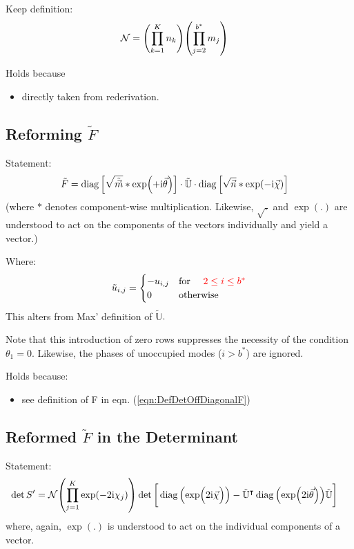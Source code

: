\documentclass[
	english,
	a4paper,
	fontsize=10pt,
	parskip=half,
	titlepage=true,
	DIV=12,
	final
]{scrreprt}
\newcommand*{\transp}{\ensuremath{^\intercal}}
\newcommand*{\iunit}{\ensuremath{\mathrm{i}}}
\DeclareMathOperator{\diag}{diag}
\begin{document}
Keep definition:
\begin{align}
	\mathcal{N}
&=
	\qty( \prod_{k=1}^{K}   n_k )
	\qty( \prod_{j=2}^{b^*} m_j )
\label{eqn:DefN}
\end{align}

Holds because
\begin{itemize}
\item directly taken from rederivation.
\end{itemize}

\subsection{Reforming $\tilde{F}$}
Statement:
\begin{align}
	\tilde{F}
&=
	\diag\qty[ \sqrt{ \tilde{\vec{m}}} * \exp(+\iunit \vec{\theta}) ]
	\cdot \tilde{\mathbb{U}} \cdot
	\diag\qty[ \sqrt{        \vec{n} } * \exp(-\iunit \vec{\chi  }) ]
\end{align}
(where $*$ denotes component-wise multiplication. Likewise, $\sqrt{.}$ and $\exp(.)$ are understood to act on the components of the vectors individually and yield a vector.)

Where:
\begin{equation}
	\tilde{u}_{i,j} = \begin{cases}
		-u_{i,j}		&\qq*{for } {\color{red} 2 \leq i \leq b^*} \\
		0			&\qotherwise*
	\end{cases}
\end{equation}
{\color{red} This alters from Max' definition of $\tilde{\mathbb{U}}$}.

Note that this introduction of zero rows suppresses the necessity of the condition $\theta_1 = 0$. Likewise, the phases of unoccupied modes ($i > b^*$) are ignored.

Holds because:
\begin{itemize}
\item see definition of F in eqn. (\ref{eqn:DefDetOffDiagonalF})
\end{itemize}

\subsection{Reformed $\tilde{F}$ in the Determinant}
Statement:
\begin{align}
	\det S'
&=
	\mathcal{N}
	\qty( \prod_{j=1}^{K} \exp(-2\iunit \chi_j) )
	\det\qty[\bigg.
		\diag\qty(\exp(\Big.2\iunit\vec{\chi}))
		-
		\tilde{\mathbb{U}}\transp
		\diag\qty(\exp(2\iunit\vec{\theta}))
		\tilde{\mathbb{U}}
	]
\end{align}
where, again, $\exp(.)$ is understood to act on the individual components of a vector.
\end{document}
